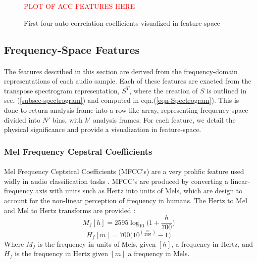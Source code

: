 \documentclass[12pt,letterpaper]{article}
\begin{document}
\begin{figure}[H]
\label{fig-FeatureACC}
\begin{center}
\textcolor{red}{PLOT OF ACC FEATURES HERE}
\end{center}
\caption{First four auto correlation coefficients visualized in feature-space}
\end{figure}




\newpage

\subsection{Frequency-Space Features}
\label{subsec-frequency}

\paragraph*{}The features described in this section are derived from the frequency-domain representations of each audio sample. Each of these features are exacted from the transpose spectrogram representation, $S^T$, where the creation of $S$ is outlined in sec. (\ref{subsec-spectrogram}) and computed in eqn.(\ref{eqn-Spectrogram}). This is done to return analysis frame into a row-like array, representing frequency space divided into $N'$ bins, with $k'$ analysis frames. For each feature, we detail the physical significance and provide a visualization in feature-space.


\subsubsection{Mel Frequency Cepstral Coefficients}

\paragraph*{}Mel Frequency Ceptstral Coefficients (MFCC's) are a very prolific feature used widly in audio classification tasks \cite{Liu,Virtanen,Zhang}. MFCC's are produced by converting a linear-frequency axis with units such as Hertz into units of Mels, which are design to account for the non-linear perception of frequency in humans. The Hertz to Mel and Mel to Hertz transforms are provided \cite{Virtanen}:
\begin{equation}
\label{eqn-HztoMel}
M_f[h] = 2595 \log_{10}\big(1+ \frac{h}{700}\big)
\end{equation}
\begin{equation}
\label{eqn-MeltoHz}
H_f[m] = 700 \big(10^{(\frac{m}{2595})}-1\big)
\end{equation}
Where $M_f$ is the frequency in units of Mels, given $[h]$, a frequency in Hertz, and $H_f$ is the frequency in Hertz given $[m]$ a frequency in Mels.
\end{document}
